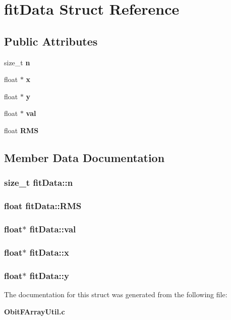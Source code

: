 \section{fit\-Data Struct Reference}
\label{structfitData}
\subsection*{Public Attributes}
\begin{CompactItemize}
\item 
size\_\-t {\bf n}
\item 
float $\ast$ {\bf x}
\item 
float $\ast$ {\bf y}
\item 
float $\ast$ {\bf val}
\item 
float {\bf RMS}
\end{CompactItemize}


\subsection{Member Data Documentation}
\subsubsection{\setlength{\rightskip}{0pt plus 5cm}size\_\-t {\bf fit\-Data::n}}\label{structfitData_o0}


\subsubsection{\setlength{\rightskip}{0pt plus 5cm}float {\bf fit\-Data::RMS}}\label{structfitData_o4}


\subsubsection{\setlength{\rightskip}{0pt plus 5cm}float$\ast$ {\bf fit\-Data::val}}\label{structfitData_o3}


\subsubsection{\setlength{\rightskip}{0pt plus 5cm}float$\ast$ {\bf fit\-Data::x}}\label{structfitData_o1}


\subsubsection{\setlength{\rightskip}{0pt plus 5cm}float$\ast$ {\bf fit\-Data::y}}\label{structfitData_o2}




The documentation for this struct was generated from the following file:\begin{CompactItemize}
\item 
{\bf Obit\-FArray\-Util.c}\end{CompactItemize}
